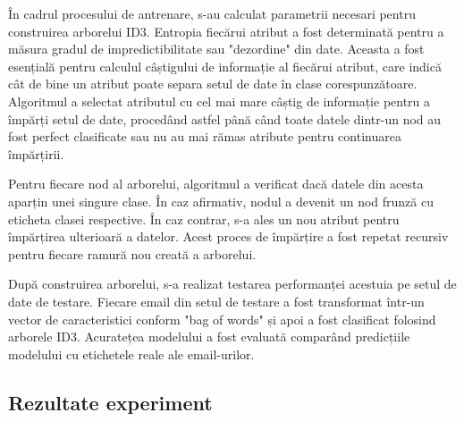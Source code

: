 \documentclass{article}
\begin{document}
În cadrul procesului de antrenare, s-au calculat parametrii necesari pentru construirea arborelui ID3. Entropia fiecărui atribut a fost determinată pentru a măsura gradul de impredictibilitate sau "dezordine" din date. Aceasta a fost esențială pentru calculul câștigului de informație al fiecărui atribut, care indică cât de bine un atribut poate separa setul de date în clase corespunzătoare. Algoritmul a selectat atributul cu cel mai mare câștig de informație pentru a împărți setul de date, procedând astfel până când toate datele dintr-un nod au fost perfect clasificate sau nu au mai rămas atribute pentru continuarea împărțirii.

Pentru fiecare nod al arborelui, algoritmul a verificat dacă datele din acesta aparțin unei singure clase. În caz afirmativ, nodul a devenit un nod frunză cu eticheta clasei respective. În caz contrar, s-a ales un nou atribut pentru împărțirea ulterioară a datelor. Acest proces de împărțire a fost repetat recursiv pentru fiecare ramură nou creată a arborelui.

După construirea arborelui, s-a realizat testarea performanței acestuia pe setul de date de testare. Fiecare email din setul de testare a fost transformat într-un vector de caracteristici conform "bag of words" și apoi a fost clasificat folosind arborele ID3. Acuratețea modelului a fost evaluată comparând predicțiile modelului cu etichetele reale ale email-urilor.
\newline


\subsection{Rezultate experiment}
\end{document}
